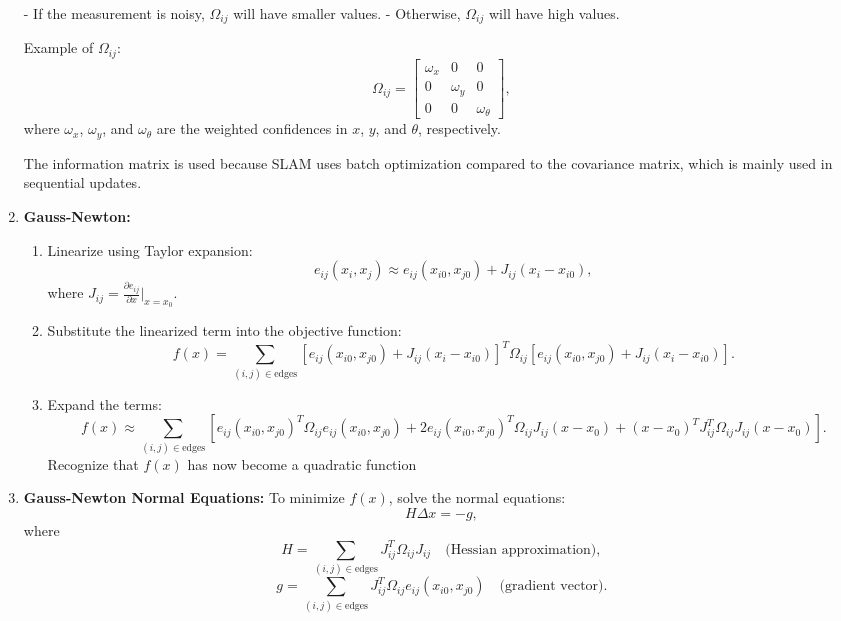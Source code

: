 \documentclass{article}
\begin{document}
\begin{enumerate}
    - If the measurement is noisy, $\Omega_{ij}$ will have smaller values.
    - Otherwise, $\Omega_{ij}$ will have high values.

    Example of $\Omega_{ij}$:
    \[
    \Omega_{ij} = 
    \begin{bmatrix}
        \omega_x & 0 & 0 \\
        0 & \omega_y & 0 \\
        0 & 0 & \omega_\theta
    \end{bmatrix},
    \]
    where $\omega_x$, $\omega_y$, and $\omega_\theta$ are the weighted confidences in $x$, $y$, and $\theta$, respectively.

    The information matrix is used because SLAM uses batch optimization compared to the covariance matrix, which is mainly used in sequential updates.

    \item \textbf{Gauss-Newton:}
    \begin{enumerate}
        \item Linearize using Taylor expansion:
        \[
        e_{ij}(x_{i}, x_{j}) \approx e_{ij}(x_{i0}, x_{j0}) + J_{ij}(x_{i} - x_{i0}),
        \]
        where $J_{ij} = \frac{\partial e_{ij}}{\partial x}\bigg|_{x=x_{0}}$.

        \item Substitute the linearized term into the objective function:
        \[
        f(x) = \sum_{(i,j) \in \text{edges}} \left[ e_{ij}(x_{i0}, x_{j0}) + J_{ij}(x_{i} - x_{i0}) \right]^T \Omega_{ij} \left[ e_{ij}(x_{i0}, x_{j0}) + J_{ij}(x_{i} - x_{i0}) \right].
        \]

        \item Expand the terms:
        \[
        f(x) \approx \sum_{(i,j) \in \text{edges}} \left[ e_{ij}(x_{i0}, x_{j0})^T \Omega_{ij} e_{ij}(x_{i0}, x_{j0}) + 2 e_{ij}(x_{i0}, x_{j0})^T \Omega_{ij} J_{ij} (x - x_0) + (x - x_0)^T J_{ij}^T \Omega_{ij} J_{ij} (x - x_0) \right].
        \]
        Recognize that $f(x)$ has now become a quadratic function
    \end{enumerate}

    \item \textbf{Gauss-Newton Normal Equations:}
    To minimize $f(x)$, solve the normal equations:
    \[
    H \Delta x = -g,
    \]
    where 
    \[
    H = \sum_{(i,j) \in \text{edges}} J_{ij}^T \Omega_{ij} J_{ij} \quad \text{(Hessian approximation)},
    \]
    \[
    g = \sum_{(i,j) \in \text{edges}} J_{ij}^T \Omega_{ij} e_{ij}(x_{i0}, x_{j0}) \quad \text{(gradient vector)}.
    \]


\end{enumerate}
\end{document}
